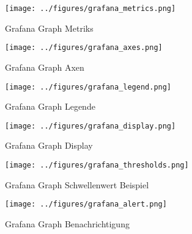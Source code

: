 \begin{figure}[tbp]
  \centering
  \texttt{[image: ../figures/grafana\_metrics.png]}
  \caption{Grafana Graph Metriks}
\label{figure:grafana_metrics}
\end{figure}

\begin{figure}[tbp]
  \centering
  \texttt{[image: ../figures/grafana\_axes.png]}
  \caption{Grafana Graph Axen}
\label{figure:grafana_axes}
\end{figure}

\begin{figure}[tbp]
  \centering
  \texttt{[image: ../figures/grafana\_legend.png]}
  \caption{Grafana Graph Legende}
\label{figure:grafana_legend}
\end{figure}

\begin{figure}[tbp]
  \centering
  \texttt{[image: ../figures/grafana\_display.png]}
  \caption{Grafana Graph Display}
\label{figure:grafana_display}
\end{figure}

\begin{figure}[tbp]
  \centering
  \texttt{[image: ../figures/grafana\_thresholds.png]}
  \caption{Grafana Graph Schwellenwert Beispiel}
\label{figure:grafana_thresholds}
\end{figure}

\begin{figure}[tbp]
  \centering
  \texttt{[image: ../figures/grafana\_alert.png]}
  \caption{Grafana Graph Benachrichtigung}
\label{figure:grafana_alert}
\end{figure}

